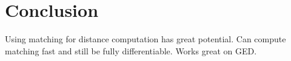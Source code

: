 \section{Conclusion}

Using matching for distance computation has great potential. Can compute matching fast and still be fully differentiable. Works great on GED.

